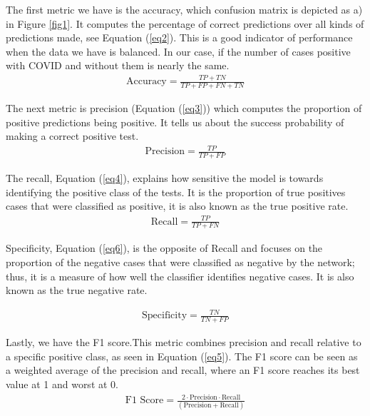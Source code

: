 \documentclass{article}
\begin{document}
The first metric we have is the accuracy, which confusion matrix is depicted as a) in Figure \ref{fig1}. It computes the percentage of correct predictions over all kinds of predictions made, see Equation (\ref{eq2}). This is a good indicator of performance when the data we have is balanced. In our case, if the number of cases positive with COVID and without them is nearly the same.\\

\begin{eqnarray}
\label{eq2}
\text{Accuracy} = \frac{TP + TN}{TP + FP + FN + TN}		
\end{eqnarray}

The next metric is precision (Equation (\ref{eq3})) which computes the proportion of positive predictions being positive. It tells us about the success probability of making a correct positive test.\\

\begin{eqnarray}
\label{eq3}
\text{Precision} = \frac{TP}{TP + FP}		
\end{eqnarray}

The recall, Equation (\ref{eq4}), explains how sensitive the model is towards identifying the positive class of the tests. It is the proportion of true positives cases that were classified as positive, it is also known as the true positive rate.\\

\begin{eqnarray}
\label{eq4}
\text{Recall} = \frac{TP}{TP + FN}		
\end{eqnarray}

Specificity, Equation (\ref{eq6}), is the opposite of Recall and focuses on the proportion of the negative cases that were classified as negative by the network; thus, it is a measure of how well the classifier identifies negative cases. It is also known as the true negative rate.

\begin{eqnarray}
\label{eq6}
\text{Specificity} = \frac{TN}{TN + FP}		
\end{eqnarray}

Lastly, we have the F1 score.This metric combines precision and recall relative to a specific positive class, as seen in Equation (\ref{eq5}). The F1 score can be seen as a weighted average of the precision and recall, where an F1 score reaches its best value at 1 and worst at 0.\\
\begin{eqnarray}
\label{eq5}
\text{F1 Score} = \frac{2 \cdot \text{Precision} \cdot \text{Recall}}{(\text{Precision} + \text{Recall})}		
\end{eqnarray}
\end{document}
